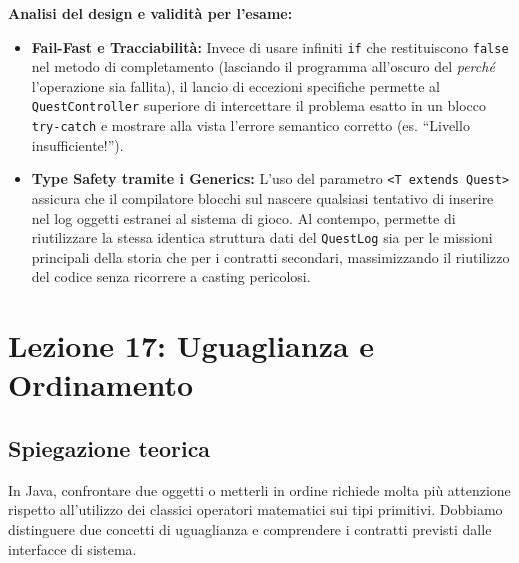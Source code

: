 \documentclass[12pt, a4paper]{article}
\begin{document}
\textbf{Analisi del design e validità per l'esame:}
\begin{itemize}
    \item \textbf{Fail-Fast e Tracciabilità:} Invece di usare infiniti \texttt{if} che restituiscono \texttt{false} nel metodo di completamento (lasciando il programma all'oscuro del \textit{perché} l'operazione sia fallita), il lancio di eccezioni specifiche permette al \texttt{QuestController} superiore di intercettare il problema esatto in un blocco \texttt{try-catch} e mostrare alla vista l'errore semantico corretto (es. ``Livello insufficiente!'').
    \item \textbf{Type Safety tramite i Generics:} L'uso del parametro \texttt{<T extends Quest>} assicura che il compilatore blocchi sul nascere qualsiasi tentativo di inserire nel log oggetti estranei al sistema di gioco. Al contempo, permette di riutilizzare la stessa identica struttura dati del \texttt{QuestLog} sia per le missioni principali della storia che per i contratti secondari, massimizzando il riutilizzo del codice senza ricorrere a casting pericolosi.
\end{itemize}

\section{Lezione 17: Uguaglianza e Ordinamento}

\subsection{Spiegazione teorica}
In Java, confrontare due oggetti o metterli in ordine richiede molta più attenzione rispetto all'utilizzo dei classici operatori matematici sui tipi primitivi. Dobbiamo distinguere due concetti di uguaglianza e comprendere i contratti previsti dalle interfacce di sistema.
\end{document}
